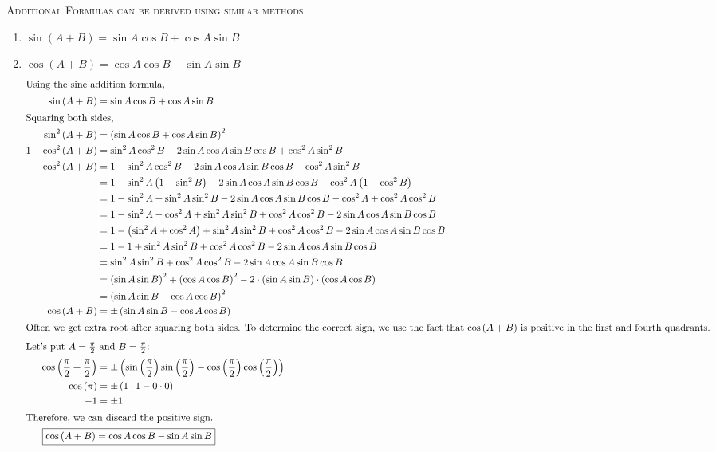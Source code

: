 \documentclass{article}
\begin{document}
\begin{center}
    \textsc{Additional Formulas can be derived using similar methods.}
\end{center}
\begin{enumerate}
    \item $ \sin\left(A+B\right) = \sin A\cos B + \cos A\sin B $
    \item $ \cos\left(A+B\right) = \cos A\cos B - \sin A\sin B $
    \begin{align*}
        \intertext{Using the sine addition formula,}
        \sin\left(A+B\right) &= \sin A\cos B + \cos A\sin B\\
        \intertext{Squaring both sides,}
        \sin^2\left(A+B\right) &= \left(\sin A\cos B + \cos A\sin B\right)^2\\
        1 - \cos^2\left(A+B\right) &= \sin^2 A\cos^2 B + 2\sin A\cos A\sin B\cos B + \cos^2 A\sin^2 B\\
        \cos^2\left(A+B\right) &= 1 - \sin^2 A\cos^2 B - 2\sin A\cos A\sin B\cos B - \cos^2 A\sin^2 B\\
        &= 1 - \sin^2 A \left(1-\sin^2 B\right) - 2\sin A\cos A\sin B\cos B - \cos^2 A\left(1-\cos^2 B\right)\\
        &= 1 - \sin^2 A + \sin^2 A\sin^2 B - 2\sin A\cos A\sin B\cos B - \cos^2 A + \cos^2 A\cos^2 B\\
        &= 1 - \sin^2 A - \cos^2 A + \sin^2 A\sin^2 B + \cos^2 A\cos^2 B - 2\sin A\cos A\sin B\cos B\\
        &= 1 - \left(\sin^2 A + \cos^2 A\right) + \sin^2 A\sin^2 B + \cos^2 A\cos^2 B - 2\sin A\cos A\sin B\cos B\\
        &= 1 - 1 + \sin^2 A\sin^2 B + \cos^2 A\cos^2 B - 2\sin A\cos A\sin B\cos B\\
        &= \sin^2 A\sin^2 B + \cos^2 A\cos^2 B - 2\sin A\cos A\sin B\cos B\\
        &= \left(\sin A \sin B\right)^2 + \left(\cos A \cos B\right)^2 - 2 \cdot \left(\sin A\sin B \right) \cdot \left( \cos A\cos B\right)\\
        &= \left(\sin A \sin B - \cos A \cos B\right)^2\\
        \cos\left(A+B\right) &= \pm \left(\sin A \sin B - \cos A \cos B\right)\\
        \intertext{Often we get extra root after squaring both sides. To determine the correct sign, we use the fact that \(\cos\left(A+B\right)\) is positive in the first and fourth quadrants.}
        \intertext{Let's put $A=\frac{\pi}{2}$ and $B=\frac{\pi}{2}$:}
        \cos\left(\frac{\pi}{2} + \frac{\pi}{2}\right) &= \pm\left(\sin\left(\frac{\pi}{2}\right)\sin\left(\frac{\pi}{2}\right)-\cos\left(\frac{\pi}{2}\right)\cos\left(\frac{\pi}{2}\right)\right)\\
        \cos\left(\pi\right) &= \pm\left(1\cdot 1 - 0\cdot 0\right)\\
        -1 &= \pm 1\\
        \intertext{Therefore, we can discard the positive sign.}
        \Aboxed{\cos\left(A+B\right) &= \cos A\cos B - \sin A\sin B}
    \end{align*}


\end{enumerate}
\end{document}
